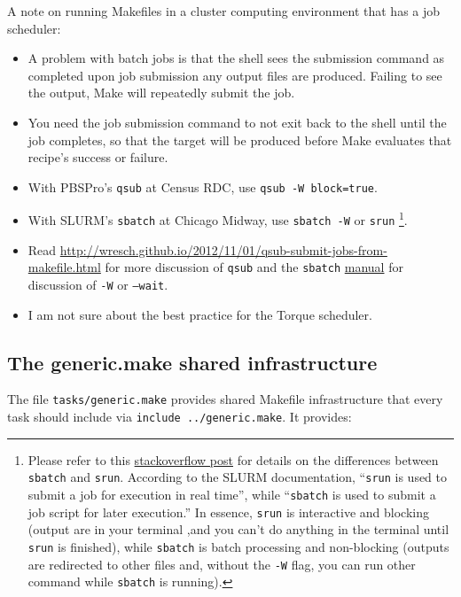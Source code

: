 A note on running Makefiles in a cluster computing environment that has a job scheduler:
\begin{itemize}
	\item A problem with batch jobs is that the shell sees the submission command as completed upon job submission any output files are produced.
	Failing to see the output, Make will repeatedly submit the job.
	\item You need the job submission command to not exit back to the shell until the job completes, so that the target will be produced before Make evaluates that recipe's success or failure.
	\item With PBSPro's \texttt{qsub} at Census RDC, use \texttt{qsub -W block=true}.
	\item With SLURM's \texttt{sbatch} at Chicago Midway, use \texttt{sbatch -W} or \texttt{srun}%
		\footnote{
			Please refer to this \href{https://stackoverflow.com/questions/43767866/slurm-srun-vs-sbatch-and-their-parameters}{stackoverflow post}
				for details on the differences
				between \texttt{sbatch} and \texttt{srun}.
			According to the SLURM documentation,
				``\texttt{srun} is used to submit a job for execution in real time'',
				while ``\texttt{sbatch} is used to submit a job script for later execution.''
			In essence, \texttt{srun} is interactive and blocking
				(output are in your terminal ,and
				you can't do anything in the terminal until \texttt{srun} is finished),
				while \texttt{sbatch} is batch processing and non-blocking
				(outputs are redirected to other files and,
				without the \texttt{-W} flag,
				you can run other command while \texttt{sbatch} is running).
		}.
	\item Read \url{http://wresch.github.io/2012/11/01/qsub-submit-jobs-from-makefile.html} for more discussion of \texttt{qsub} and the \texttt{sbatch} \href{https://slurm.schedmd.com/sbatch.html}{manual} for discussion of \texttt{-W} or \texttt{--wait}.
	\item I am not sure about the best practice for the Torque scheduler.
\end{itemize}

\subsection{The generic.make shared infrastructure}

The file \texttt{tasks/generic.make} provides shared Makefile infrastructure
that every task should include via \texttt{include ../generic.make}.
It provides:

